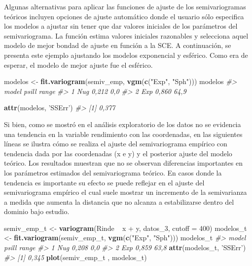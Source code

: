 \documentclass[11pt,b5paper,]{krantz}
\newenvironment{Shaded}{}{}
\newcommand{\KeywordTok}[1]{\textcolor[rgb]{0.00,0.44,0.13}{\textbf{#1}}}
\newcommand{\DataTypeTok}[1]{\textcolor[rgb]{0.56,0.13,0.00}{#1}}
\newcommand{\DecValTok}[1]{\textcolor[rgb]{0.25,0.63,0.44}{#1}}
\newcommand{\StringTok}[1]{\textcolor[rgb]{0.25,0.44,0.63}{#1}}
\newcommand{\CommentTok}[1]{\textcolor[rgb]{0.38,0.63,0.69}{\textit{#1}}}
\newcommand{\OperatorTok}[1]{\textcolor[rgb]{0.40,0.40,0.40}{#1}}
\newcommand{\NormalTok}[1]{#1}
\begin{document}
Algunas alternativas para aplicar las funciones de ajuste de los
semivariogramas teóricos incluyen opciones de ajuste automático donde el
usuario sólo especifica los modelos a ajustar sin tener que dar valores
iniciales de los parámetros del semivariograma. La función estima
valores iniciales razonables y selecciona aquel modelo de mejor bondad
de ajuste en función a la SCE. A continuación, se presenta este ejemplo
ajustando los modelos exponencial y esférico. Como era de esperar, el
modelo de mejor ajuste fue el esférico.

\begin{Shaded}
\begin{Highlighting}[]
\NormalTok{modelos <-}\StringTok{ }\KeywordTok{fit.variogram}\NormalTok{(semiv_emp, }
                         \KeywordTok{vgm}\NormalTok{(}\KeywordTok{c}\NormalTok{(}\StringTok{"Exp"}\NormalTok{, }\StringTok{"Sph"}\NormalTok{)))}
\NormalTok{modelos}
\CommentTok{#>   model psill range}
\CommentTok{#> 1   Nug 0,212   0,0}
\CommentTok{#> 2   Exp 0,860  64,9}
\end{Highlighting}
\end{Shaded}

\begin{Shaded}
\begin{Highlighting}[]
\KeywordTok{attr}\NormalTok{(modelos, }\StringTok{'SSErr'}\NormalTok{)}
\CommentTok{#> [1] 0,377}
\end{Highlighting}
\end{Shaded}

Si bien, como se mostró en el análisis exploratorio de los datos no se
evidencia una tendencia en la variable rendimiento con las coordenadas,
en las siguientes líneas se ilustra cómo se realiza el ajuste del
semivariograma empírico con tendencia dada por las coordenadas (x e y) y
el posterior ajuste del modelo teórico. Los resultados muestran que no
se observan diferencias importantes en los parámetros estimados del
semivariograma teórico. En casos donde la tendencia es importante su
efecto se puede reflejar en el ajuste del semivariograma empírico el
cual suele mostrar un incremento de la semivarianza a medida que aumenta
la distancia que no alcanza a estabilizarse dentro del dominio bajo
estudio.

\begin{Shaded}
\begin{Highlighting}[]
\NormalTok{semiv_emp_t <-}\StringTok{ }\KeywordTok{variogram}\NormalTok{(Rinde }\OperatorTok{~}\StringTok{ }\NormalTok{x }\OperatorTok{+}\StringTok{ }\NormalTok{y, }
\NormalTok{                         datos_}\DecValTok{3}\NormalTok{, }\DataTypeTok{cutoff =} \DecValTok{400}\NormalTok{)}
\NormalTok{modelos_t <-}\StringTok{ }\KeywordTok{fit.variogram}\NormalTok{(semiv_emp_t, }
                           \KeywordTok{vgm}\NormalTok{(}\KeywordTok{c}\NormalTok{(}\StringTok{"Exp"}\NormalTok{, }\StringTok{"Sph"}\NormalTok{)))}
\NormalTok{modelos_t}
\CommentTok{#>   model psill range}
\CommentTok{#> 1   Nug 0,208   0,0}
\CommentTok{#> 2   Exp 0,859  63,8}
\KeywordTok{attr}\NormalTok{(modelos_t, }\StringTok{'SSErr'}\NormalTok{)}
\CommentTok{#> [1] 0,345}
\KeywordTok{plot}\NormalTok{(semiv_emp_t , modelos_t)}
\end{Highlighting}
\end{Shaded}
\end{document}
